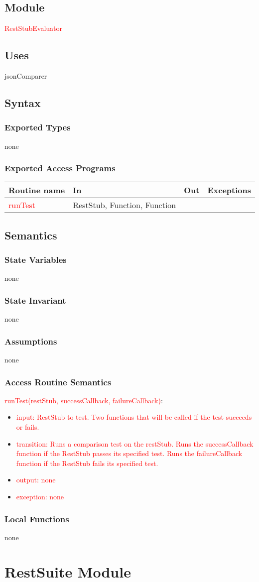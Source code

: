 \documentclass[12pt, titlepage]{article}
\newcommand{\newModule}[9]{
	\subsection* {Module}
		#1
	\subsection* {Uses}
		#2
	\subsection* {Syntax}
		\subsubsection* {Exported Types}
			#3
		\subsubsection* {Exported Access Programs}
			#4
	\subsection* {Semantics}
		\subsubsection* {State Variables}
			#5
		\subsubsection* {State Invariant}
			#6
		\subsubsection* {Assumptions}
			#7
		\subsubsection* {Access Routine Semantics}
			#8
		\subsubsection* {Local Functions}
			#9
}
\newcommand{\revAccessProgram}[5]{
	\noindent \textcolor{red}{#1}:
		\begin{itemize}
		    \item \textcolor{red}{input: #2}
			\item \textcolor{red}{transition: #3}
			\item \textcolor{red}{output: #4}
			\item \textcolor{red}{exception: #5}
		\end{itemize}
}
\newcommand{\row}[4]{#1 & #2 & #3 & #4 ~\\ \hline}
\newcommand{\accessProgramsTableStart}{
\begin{tabular}{| l | l | l | l |}
\hline
\textbf{Routine name} & \textbf{In} & \textbf{Out} & \textbf{Exceptions}\\
\hline
}
\newcommand{\accessProgramsTableEnd}{
	\end{tabular}
}
\begin{document}
\label{RestStubEvaluator}

\newModule{\textcolor{red}{RestStubEvaluator}}
	{%
		jsonComparer
	}
	{%
		none
	}
	{%
		\accessProgramsTableStart
			\row{\textcolor{red}{runTest}}{RestStub, Function, Function}{}{}
		\accessProgramsTableEnd
	}
	{%
		none \\
	}
	{%
        none
	}
	{%
		none
	}
	{%
		\revAccessProgram{runTest(restStub, successCallback, failureCallback)}
			{%
				RestStub to test.
				Two functions that will be called if the test succeeds or fails.
			}
			{%
				Runs a comparison test on the restStub.
				Runs the successCallback function if the RestStub passes its specified test.
				Runs the failureCallback function if the RestStub fails its specified test.
			}
			{%
				none
			}
			{%
				none
			}
	}
	{%
		none
	}
	

\newpage

\section {RestSuite Module}

\label{RestSuite}
\end{document}
